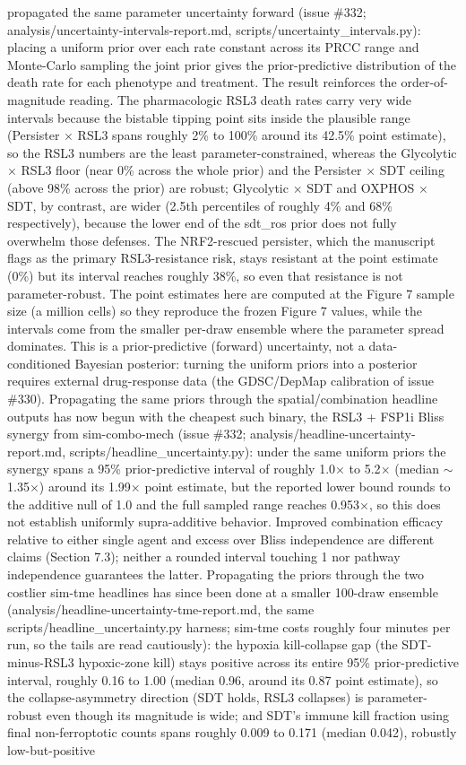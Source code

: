 \documentclass[11pt,twoside,openright]{report}
\begin{document}
\begin{enumerate}
propagated the same parameter uncertainty forward (issue \#332; analysis/uncertainty-intervals-report.md, scripts/uncertainty\_intervals.py): placing a uniform prior over each rate constant across its PRCC range and Monte-Carlo sampling the joint prior gives the prior-predictive distribution of the death rate for each phenotype and treatment. The result reinforces the order-of-magnitude reading. The pharmacologic RSL3 death rates carry very wide intervals because the bistable tipping point sits inside the plausible range (Persister $\times$ RSL3 spans roughly 2\% to 100\% around its 42.5\% point estimate), so the RSL3 numbers are the least parameter-constrained, whereas the Glycolytic $\times$ RSL3 floor (near 0\% across the whole prior) and the Persister $\times$ SDT ceiling (above 98\% across the prior) are robust; Glycolytic $\times$ SDT and OXPHOS $\times$ SDT, by contrast, are wider (2.5th percentiles of roughly 4\% and 68\% respectively), because the lower end of the sdt\_ros prior does not fully overwhelm those defenses. The NRF2-rescued persister, which the manuscript flags as the primary RSL3-resistance risk, stays resistant at the point estimate (0\%) but its interval reaches roughly 38\%, so even that resistance is not parameter-robust. The point estimates here are computed at the Figure 7 sample size (a million cells) so they reproduce the frozen Figure 7 values, while the intervals come from the smaller per-draw ensemble where the parameter spread dominates. This is a prior-predictive (forward) uncertainty, not a data-conditioned Bayesian posterior: turning the uniform priors into a posterior requires external drug-response data (the GDSC/DepMap calibration of issue \#330). Propagating the same priors through the spatial/combination headline outputs has now begun with the cheapest such binary, the RSL3 + FSP1i Bliss synergy from sim-combo-mech (issue \#332; analysis/headline-uncertainty-report.md, scripts/headline\_uncertainty.py): under the same uniform priors the synergy spans a 95\% prior-predictive interval of roughly 1.0$\times$ to 5.2$\times$ (median $\sim$1.35$\times$) around its 1.99$\times$ point estimate, but the reported lower bound rounds to the additive null of 1.0 and the full sampled range reaches 0.953$\times$, so this does not establish uniformly supra-additive behavior. Improved combination efficacy relative to either single agent and excess over Bliss independence are different claims (Section 7.3); neither a rounded interval touching 1 nor pathway independence guarantees the latter. Propagating the priors through the two costlier sim-tme headlines has since been done at a smaller 100-draw ensemble (analysis/headline-uncertainty-tme-report.md, the same scripts/headline\_uncertainty.py harness; sim-tme costs roughly four minutes per run, so the tails are read cautiously): the hypoxia kill-collapse gap (the SDT-minus-RSL3 hypoxic-zone kill) stays positive across its entire 95\% prior-predictive interval, roughly 0.16 to 1.00 (median 0.96, around its 0.87 point estimate), so the collapse-asymmetry direction (SDT holds, RSL3 collapses) is parameter-robust even though its magnitude is wide; and SDT's immune kill fraction using final non-ferroptotic counts spans roughly 0.009 to 0.171 (median 0.042), robustly low-but-positive 
\end{enumerate}
\end{document}
